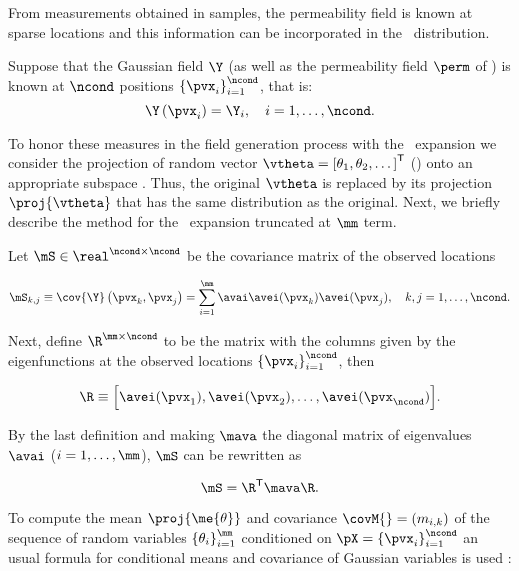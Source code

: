 From measurements obtained in samples, the permeability field is known at sparse locations and this information can be incorporated in the \apri\ distribution.

Suppose that the Gaussian field $\Y$ (as well as the permeability field $\perm$ of ) is known at $\ncond$ positions $\left\{ \pvx_{i}\right\}_{i=1}^{\ncond}$, that is:
\begin{equation}
 \Y \left( \pvx_{i} \right) = \Y_{i},\quad i=1,\dots,\ncond.
\end{equation}

To honor these measures in the field generation process with the \kl\ expansion we consider the projection of random vector $\vtheta = \left[\theta_{1}, \theta_{2},\dots  \right]^{\mathsf{T}}$ () onto an appropriate subspace \citep{Ossiander2014}.
Thus, the original $\vtheta$ is replaced by its projection $\proj{\vtheta}$ that has the same distribution as the original. 
Next, we briefly describe the method for the \kl\ expansion truncated at $\mm$ term.

Let $\mS\in\real^{\ncond\times\ncond}$ be the covariance matrix of the observed locations

\begin{equation}
 \mS_{k,j} \equiv \cov{\Y}\left( \pvx_{k}, \pvx_{j} \right) =
 \sum_{i=1}^{\mm} \avai\avei(\pvx_{k})\avei(\pvx_{j}),
 \quad k,j = 1,\dots,\ncond.
\end{equation}

\noindent Next, define $\R^{\mm\times\ncond}$ to be the matrix with the columns given by the eigenfunctions at the observed locations $\left\{ \pvx_{i}\right\}_{i=1}^{\ncond}$, then

\begin{equation}
 \R \equiv \Big[ \avei(\pvx_{1}),\avei(\pvx_{2}),\dots,\avei(\pvx_{\ncond}) \Big].
 \label{mR}
\end{equation}

\noindent By the last definition and making $\mava$ the diagonal matrix of eigenvalues $\avai$ ($i=1,\dots,\mm$), $\mS$ can be rewritten as

\begin{equation*}
 \mS = \R^{\mathsf{T}}\mava\R.
\end{equation*}

To compute the mean $\proj{\me{\theta}}$ and covariance $\covM{} = (m_{i,k})$ of the sequence of random variables $\left\{ \theta_{i} \right\}_{i=1}^{\mm}$ conditioned on $\pX = \left\{ \pvx_{i}\right\}_{i=1}^{\ncond}$ an usual formula for conditional means and covariance of Gaussian variables is used \citep{tong1990multivariate}:

